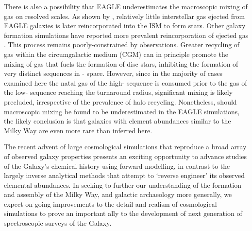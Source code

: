 There is also a possibility that EAGLE underestimates the macroscopic mixing of gas on resolved scales. As shown by \citet{2016arXiv160406803C}, relatively little interstellar gas ejected from EAGLE galaxies is later reincorporated into the ISM to form stars. Other galaxy formation simulations have reported more prevalent reincorporation of ejected gas \citep[see, e.g.][]{2017MNRAS.470.4698A}. This process remains poorly-constrained by observations. Greater recycling of gas within the circumgalactic medium (CGM) can in principle promote the mixing of gas that fuels the formation of disc stars, inhibiting the formation of very distinct sequences in \afe{}-\feh{} space. However, since in the majority of cases examined here the natal gas of the high-\afe{} sequence is consumed prior to the gas of the low-\afe{} sequence reaching the turnaround radius, significant mixing is likely precluded, irrespective of the prevalence of halo recycling. Nonetheless, should macroscopic mixing be found to be underestimated in the EAGLE simulations, the likely conclusion is that galaxies with element abundances similar to the Milky Way are even more rare than inferred here.

The recent advent of large cosmological simulations that reproduce a broad array of observed galaxy properties presents an exciting opportunity to advance studies of the Galaxy's chemical history using forward modelling, in contrast to the largely inverse analytical methods that attempt to `reverse engineer' its observed elemental abundances. In seeking to further our understanding of the formation and assembly of the Milky Way, and galactic archaeology more generally, we expect on-going improvements to the detail and realism of cosmological simulations to prove an important ally to the development of next generation of spectroscopic surveys of the Galaxy.

